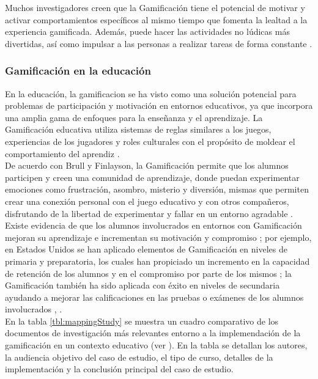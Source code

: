 \noindent Muchos investigadores creen que la Gamificación tiene el potencial de motivar y activar comportamientos específicos al mismo tiempo que fomenta la lealtad a la experiencia gamificada. Además, puede hacer las actividades no lúdicas más divertidas, así como impulsar a las personas a realizar tareas de forma constante \cite{Aldemir}.
\clearpage


\subsubsection{Gamificación en la educación}

En la educación, la \gls{gamificacion} se ha visto como una solución potencial para problemas de participación y motivación en entornos educativos, ya que incorpora una amplia gama de enfoques para la enseñanza y el aprendizaje. La Gamificación educativa utiliza sistemas de reglas similares a los juegos, experiencias de los jugadores y roles culturales con el propósito de moldear el comportamiento del aprendiz \cite{Aldemir}.\\
    
\noindent De acuerdo con Brull y Finlayson, la Gamificación permite que los alumnos participen y creen una comunidad de aprendizaje, donde puedan experimentar emociones como frustración, asombro, misterio y diversión, mismas que permiten crear una conexión personal con el juego educativo y con otros compañeros, disfrutando de la libertad de experimentar y fallar en un entorno agradable \cite{BrullFinlayson}.\\

\noindent Existe evidencia de que los alumnos involucrados en entornos con Gamificación mejoran su aprendizaje e incrementan su motivación y compromiso \cite{ChuHung}; por ejemplo, en Estados Unidos se han aplicado elementos de Gamificación en niveles de primaria y preparatoria, los cuales han propiciado un incremento en la capacidad de retención de los alumnos y en el compromiso por parte de los mismos \cite{BrullFinlayson}; la Gamificación también ha sido aplicada con éxito en niveles de secundaria ayudando a mejorar las calificaciones en las pruebas o exámenes de los alumnos involucrados \cite{UPIICSA}, \cite{Admiraal}.\\

\noindent En la tabla \ref{tbl:mappingStudy} se muestra un cuadro comparativo de los documentos de investigación más relevantes entorno a la implemendación de la gamificación en un contexto educativo (ver \cite{mappingStudy}). En la tabla se detallan los autores, la audiencia objetivo del caso de estudio, el tipo de curso, detalles de la implementación y la conclusión principal del caso de estudio.\\


